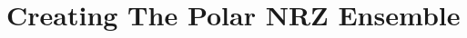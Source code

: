 \chapter[Creating The Polar NRZ Ensemble]{Creating The Polar NRZ Ensemble}
\label{cp:creating-the-polar-nrz-ensemble}
